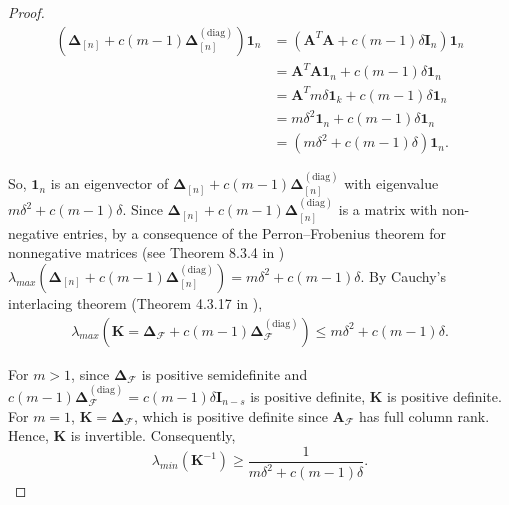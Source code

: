 \documentclass[journal,draftcls,onecolumn]{IEEEtran}
\theoremstyle{mystyle}
\newcommand{\bfI}{\mathbf{I}}
\newcommand{\bfK}{\mathbf{K}}
\newcommand{\cF}{\mathcal{F}}
\newcommand{\aditya}[1]{\marginpar{+}{\bf Aditya's remark}: {\em #1}}
\begin{document}
\begin{proof}
\begin{align*}
(\mathbf{\Delta}_{[n]} + c(m-1)\mathbf{\Delta}^{(\text{diag})}_{[n]})\mathbf{1}_n &= (\mathbf{A}^T\mathbf{A} + c(m-1)\delta \mathbf{I}_n) \mathbf{1}_n\\
&= \mathbf{A}^T\mathbf{A} \mathbf{1}_n + c(m-1) \delta \mathbf{1}_n\\
&= \mathbf{A}^T m\delta \mathbf{1}_k + c(m-1) \delta \mathbf{1}_n\\
& = m\delta^2 \mathbf{1}_n + c(m-1)\delta \mathbf{1}_n\\
&= (m\delta^2 + c(m-1) \delta) \mathbf{1}_n.
\end{align*}

So, $\mathbf{1}_n$ is an eigenvector of $\mathbf{\Delta}_{[n]} + c(m-1)\mathbf{\Delta}^{(\text{diag})}_{[n]}$ with eigenvalue $m\delta^2 + c(m-1)\delta$. Since $\mathbf{\Delta}_{[n]} + c(m-1)\mathbf{\Delta}^{(\text{diag})}_{[n]}$ is a matrix with non-negative entries, by a consequence of the Perron–Frobenius theorem for nonnegative matrices (see Theorem 8.3.4 in \cite{horn2012matrix}) %
$\lambda_{max}\left(\mathbf{\Delta}_{[n]} + c(m-1)\mathbf{\Delta}^{(\text{diag})}_{[n]}\right) = m\delta^2 + c(m-1)\delta$. 
By Cauchy's interlacing theorem (Theorem 4.3.17 in \cite{horn2012matrix}), 
\begin{align*}
\lambda_{max}\left(\bfK = \mathbf{\Delta}_{\mathcal{F}} + c(m-1)\mathbf{\Delta}^{(\text{diag})}_{\mathcal{F}}\right) \le m\delta^2 + c(m-1)\delta.
\end{align*}

For $m>1$, since $\mathbf{\Delta}_{\cF}$ is positive semidefinite and $c(m-1) \mathbf{\Delta}^{(\text{diag})}_{\cF} = c(m-1) \delta \bfI_{n-s}$ is positive definite, $\bfK$ is positive definite. For $m=1$, $\mathbf K=\mathbf{\Delta}_{\mathcal F}$, which is
positive definite since $\mathbf A_{\mathcal F}$ has full column rank.
Hence, $\mathbf K$ is invertible. Consequently, 
\begin{equation}\label{eq:lambda_min}
\lambda_{min}\left(\bfK^{-1}\right) \ge \frac{1}{m\delta^2 + c(m-1)\delta}.
\end{equation}


\end{proof}
\end{document}
